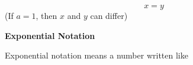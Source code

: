 \begin{description}
\begin{description}
{\begin{equation}
    x=y\tag{9.41}
      \end{equation}
    }
        (If \begin{math}a=1\end{math}, then \begin{math}x\end{math} and \begin{math}y\end{math} can differ)
        \\\end{description}
	    \item[] \noindent\raggedright {\bf  Exponential Notation }\\\begin{description}\item{\hspace{.3cm}}\hspace{.3cm}
      \label{m38359*id62672}Exponential notation means a number written like\par 
      \label{m38359*id62677}\nopagebreak\noindent{}
    \ifthenelse{\lengthtest{\mymathboxwidth < \columnwidth}}{%
    \begin{equation}

\end{equation}}
\end{description}
\end{description}
